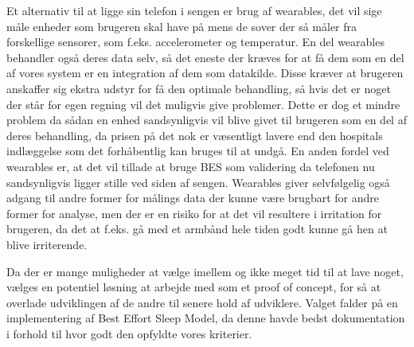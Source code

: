 Et alternativ til at ligge sin telefon i sengen er brug af wearables, det vil sige måle enheder som brugeren skal have på mens de sover der så måler fra forskellige sensorer, som f.eks. accelerometer og temperatur.
En del wearables behandler også deres data selv, så det eneste der kræves for at få dem som en del af vores system er en integration af dem som datakilde.
Disse kræver at brugeren anskaffer sig ekstra udstyr for få den optimale behandling, så hvis det er noget der står for egen regning vil det muligvis give problemer.
Dette er dog et mindre problem da sådan en enhed sandsynligvis vil blive givet til brugeren som en del af deres behandling, da prisen på det nok er væsentligt lavere end den hospitals indlæggelse som det forhåbentlig kan bruges til at undgå. 
En anden fordel ved wearables er, at det vil tillade at bruge BES som validering da telefonen nu sandsynligvis ligger stille ved siden af sengen.
Wearables giver selvfølgelig også adgang til andre former for målings data der kunne være brugbart for andre former for analyse, men der er en risiko for at det vil resultere i irritation for brugeren, da det at f.eks. gå med et armbånd hele tiden godt kunne gå hen at blive irriterende.

Da der er mange muligheder at vælge imellem og ikke meget tid til at lave noget, vælges en potentiel løsning at arbejde med som et proof of concept, for så at overlade udviklingen af de andre til senere hold af udviklere.
Valget falder på en implementering af Best Effort Sleep Model, da denne havde bedst dokumentation i forhold til hvor godt den opfyldte vores kriterier.

